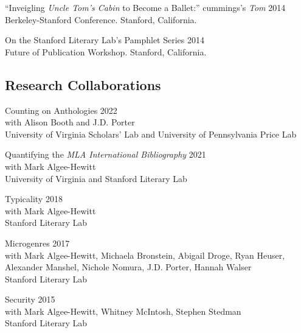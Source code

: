 \documentclass[
  12pt,
  letterpaper,
]{article}
\begin{document}
``Inveigling \emph{Uncle Tom's Cabin} to Become a Ballet:'' cummings's
\emph{Tom} \hfill 2014\\
\hspace*{0.333em} Berkeley-Stanford Conference. Stanford, California.

On the Stanford Literary Lab's Pamphlet Series \hfill 2014\\
\hspace*{0.333em} Future of Publication Workshop. Stanford, California.

\hypertarget{research-collaborations}{%
\subsection{Research Collaborations}\label{research-collaborations}}

Counting on Anthologies \hfill 2022\\
\hspace*{0.333em} with Alison Booth and J.D. Porter\\
\hspace*{0.333em} University of Virginia Scholars' Lab and University of
Pennsylvania Price Lab

Quantifying the \emph{MLA International Bibliography} \hfill 2021\\
\hspace*{0.333em} with Mark Algee-Hewitt\\
\hspace*{0.333em} University of Virginia and Stanford Literary Lab

Typicality \hfill 2018\\
\hspace*{0.333em} with Mark Algee-Hewitt\\
\hspace*{0.333em} Stanford Literary Lab

Microgenres \hfill 2017\\
\hspace*{0.333em} with Mark Algee-Hewitt, Michaela Bronstein, Abigail
Droge, Ryan Heuser,\\
\hspace*{0.333em} Alexander Manshel, Nichole Nomura, J.D. Porter, Hannah
Walser\\
\hspace*{0.333em} Stanford Literary Lab

Security \hfill 2015\\
\hspace*{0.333em} with Mark Algee-Hewitt, Whitney McIntosh, Stephen
Stedman\\
\hspace*{0.333em} Stanford Literary Lab
\end{document}
